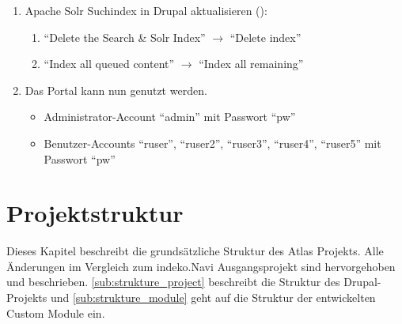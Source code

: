 \begin{enumerate}
	\item Apache Solr Suchindex in Drupal aktualisieren ():
	\begin{enumerate}
		\item \enquote{Delete the Search \& Solr Index} $\rightarrow$ \enquote{Delete index}

		\item \enquote{Index all queued content}  $\rightarrow$ \enquote{Index all remaining}
	\end{enumerate}

	\item Das Portal kann nun genutzt werden.
	\begin{itemize}
		\item Administrator-Account \enquote{admin} mit Passwort \enquote{pw}
		\item Benutzer-Accounts \enquote{ruser}, \enquote{ruser2}, \enquote{ruser3}, \enquote{ruser4}, \enquote{ruser5}  mit Passwort \enquote{pw}
	\end{itemize}
\end{enumerate}



\section{Projektstruktur}
Dieses Kapitel beschreibt die grundsätzliche Struktur des Atlas Projekts. Alle Änderungen im Vergleich zum \acrshort{indeko}.Navi Ausgangsprojekt sind hervorgehoben und beschrieben. \cref{sub:strukture_project} beschreibt die Struktur des Drupal-Projekts und \cref{sub:strukture_module} geht auf die Struktur der entwickelten Custom Module ein.


